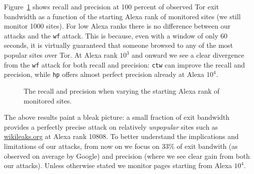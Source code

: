 Figure~\ref{fig:wfdns:alexa} shows recall and precision at 100 percent of
observed Tor exit bandwidth as a function of the starting Alexa rank of
monitored sites (we still monitor 1000 sites).
For low Alexa ranks there is no difference between our attacks and the
\texttt{wf} attack. This is because, even with a window of only 60 seconds,
it is virtually guaranteed that someone browsed to any of the most popular
sites over Tor. At Alexa rank $10^3$ and onward we see a clear divergence from
the \texttt{wf} attack for both recall and precision:
\texttt{ctw} can improve the recall and precision, while
\texttt{hp} offers almost perfect precision already at Alexa $10^4$.

\begin{figure}[t]
\centering
{}
\caption{The recall and precision when varying the starting Alexa rank of
monitored sites.}
\label{fig:wfdns:alexa}
\end{figure}

The above results paint a bleak picture: a small fraction of exit
bandwidth provides a perfectly precise attack on relatively
\emph{unpopular} sites such as \url{wikileaks.org} at Alexa rank 10808.
To better understand the implications and limitations of our attacks,
from now on we focus on
33\% of exit bandwith (as observed on average by Google) and
precision (where we see clear gain from both our attacks).
Unless otherwise stated
we monitor pages starting from Alexa $10^4$.

